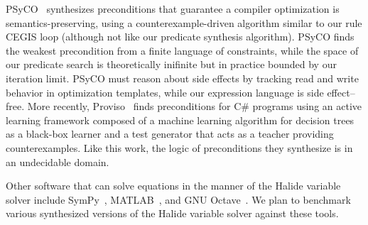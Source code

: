 PSyCO~\cite{lopes2014weakest} synthesizes preconditions that guarantee a compiler optimization is semantics-preserving, using a counterexample-driven algorithm similar to our rule CEGIS loop (although not like our predicate synthesis algorithm). PSyCO finds the weakest precondition from a finite language of constraints, while the space of our predicate search is theoretically inifinite but in practice bounded by our iteration limit. PSyCO must reason about side effects by tracking read and write behavior in optimization templates, while our expression language is side effect--free. More recently, Proviso~\cite{astorga2019learning} finds preconditions for C\# programs using an active learning framework composed of a machine learning algorithm for decision trees as a black-box learner and a test generator that acts as a teacher providing counterexamples. Like this work, the logic of preconditions they synthesize is in an undecidable domain.

Other software that can solve equations in the manner of the Halide variable solver include SymPy~\cite{10.7717/peerj-cs.103}, MATLAB~\cite{higham2016matlab}, and GNU Octave~\cite{eaton1997gnu}. We plan to benchmark various synthesized versions of the Halide variable solver against these tools. 